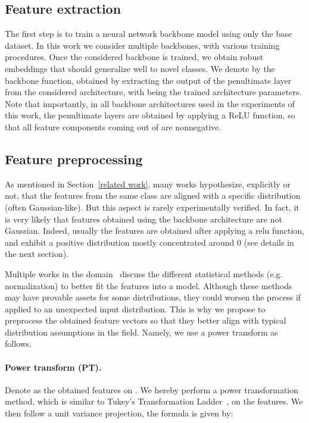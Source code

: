 \documentclass[twoside]{article}
\begin{document}
\subsection{Feature extraction}

The first step is to train a neural network backbone model using only the base dataset. In this work we consider multiple backbones, with various training procedures. Once the considered backbone is trained, we obtain robust embeddings that should generalize well to novel classes. We denote by  the backbone function, obtained by extracting the output of the penultimate layer from the considered architecture, with  being the trained architecture parameters.
Note that importantly, in all backbone architectures used in the experiments of this work, the penultimate layers are obtained by applying a ReLU function, so that all feature components coming out of  are nonnegative.

\subsection{Feature preprocessing}

As mentioned in Section~\ref{related work}, many works hypothesize, explicitly or not, that the features from the same class are aligned with a specific distribution (often Gaussian-like). But this aspect is rarely experimentally verified. In fact, it is very likely that features obtained using the backbone architecture are not Gaussian. Indeed, usually the features are obtained after applying a relu function, and exhibit a positive distribution mostly concentrated around 0 (see details in the next section).

Multiple works in the domain~\cite{wang2019simpleshot, lichtenstein2020tafssl} discuss the different statistical methods (e.g. normalization) to better fit the features into a model. Although these methods may have provable assets for some distributions, they could worsen the process if applied to an unexpected input distribution. This is why we propose to preprocess the obtained feature vectors so that they better align with typical distribution assumptions in the field. Namely, we use a power transform as follows.

\paragraph{Power transform (PT).} Denote  as the obtained features on . We hereby perform a power transformation method, which is similar to Tukey's Transformation Ladder~\cite{tukey1977exploratory}, on the features. We then follow a unit variance projection, the formula is given by:
\end{document}
